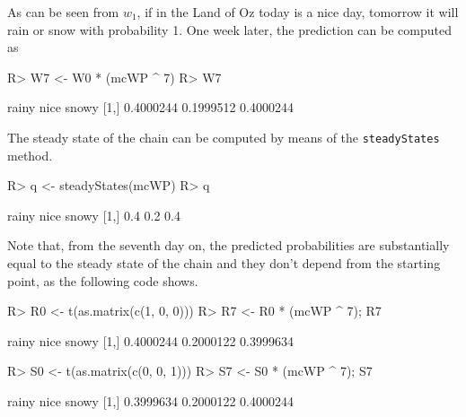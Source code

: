\documentclass[
  nojss]{jss}
\begin{document}
As can be seen from \(w_{1}\), if in the Land of Oz today is a nice day, tomorrow it will rain or snow with probability 1. One week later, the prediction can be computed as

\begin{CodeChunk}

\begin{CodeInput}
R> W7 <- W0 * (mcWP ^ 7)
R> W7
\end{CodeInput}

\begin{CodeOutput}
         rainy      nice     snowy
[1,] 0.4000244 0.1999512 0.4000244
\end{CodeOutput}
\end{CodeChunk}

The steady state of the chain can be computed by means of the \texttt{steadyStates} method.

\begin{CodeChunk}

\begin{CodeInput}
R> q <- steadyStates(mcWP)
R> q
\end{CodeInput}

\begin{CodeOutput}
     rainy nice snowy
[1,]   0.4  0.2   0.4
\end{CodeOutput}
\end{CodeChunk}

Note that, from the seventh day on, the predicted probabilities are substantially equal to the steady state of the chain and they don't depend from the starting point, as the following code shows.

\begin{CodeChunk}

\begin{CodeInput}
R> R0 <- t(as.matrix(c(1, 0, 0)))
R> R7 <- R0 * (mcWP ^ 7); R7
\end{CodeInput}

\begin{CodeOutput}
         rainy      nice     snowy
[1,] 0.4000244 0.2000122 0.3999634
\end{CodeOutput}

\begin{CodeInput}
R> S0 <- t(as.matrix(c(0, 0, 1)))
R> S7 <- S0 * (mcWP ^ 7); S7
\end{CodeInput}

\begin{CodeOutput}
         rainy      nice     snowy
[1,] 0.3999634 0.2000122 0.4000244
\end{CodeOutput}
\end{CodeChunk}
\end{document}
